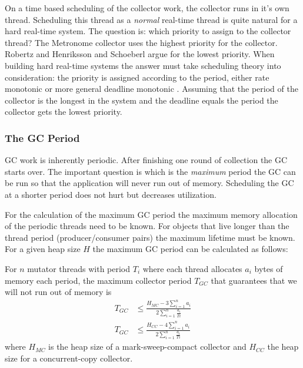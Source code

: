 On a time based scheduling of the collector work, the collector runs
in it's own thread. Scheduling this thread as a \emph{normal}
real-time thread is quite natural for a hard real-time system. The
question is: which priority to assign to the collector thread? The
Metronome collector \cite{Bacon03} uses the highest priority for the
collector. Robertz and Henriksson \cite{780745} and Schoeberl
\cite{jop:rtgc_sched} argue for the lowest priority. When building
hard real-time systems the answer must take scheduling theory into
consideration: the priority is assigned according to the period,
either rate monotonic \cite{321743} or more general deadline
monotonic \cite{Audsley-etal91}. Assuming that the period of the
collector is the longest in the system and the deadline equals the
period the collector gets the lowest priority.

\subsubsection{The GC Period}

GC work is inherently periodic. After finishing one round of
collection the GC starts over. The important question is which is
the \emph{maximum} period the GC can be run so that the application
will never run out of memory. Scheduling the GC at a shorter period
does not hurt but decreases utilization.

For the calculation of the maximum GC period the maximum memory
allocation of the periodic threads need to be known. For objects
that live longer than the thread period (producer/consumer pairs)
the maximum lifetime must be known. For a given heap size $H$ the
maximum GC period can be calculated \cite{780745, jop:rtgc_sched} as
follows:

For $n$ mutator threads with period $T_i$ where each thread
allocates $a_i$ bytes of memory each period, the maximum collector period
$T_{GC}$ that guarantees that we will not run out of memory is
%
\begin{align}\label{nth:mc:theorem}
    T_{GC} & \le \frac{H_{MC}-3\sum_{i=1}^{n} a_i}{2\sum_{i=1}^{n} \frac{a_i}{Ti}}\\
    \label{nth:cc:theorem}
    T_{GC} & \le \frac{H_{CC}-4\sum_{i=1}^{n} a_i}{2\sum_{i=1}^{n}
    \frac{a_i}{Ti}}
\end{align}
%
where $H_{MC}$ is the heap size of a mark-sweep-compact collector
and $H_{CC}$ the heap size for a concurrent-copy collector.

